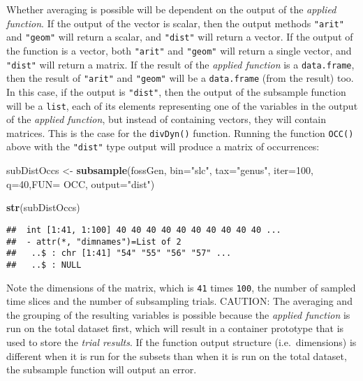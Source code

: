 \documentclass[]{article}
\newenvironment{Shaded}{\begin{snugshade}}{\end{snugshade}}
\newcommand{\DataTypeTok}[1]{\textcolor[rgb]{0.13,0.29,0.53}{#1}}
\newcommand{\DecValTok}[1]{\textcolor[rgb]{0.00,0.00,0.81}{#1}}
\newcommand{\KeywordTok}[1]{\textcolor[rgb]{0.13,0.29,0.53}{\textbf{#1}}}
\newcommand{\NormalTok}[1]{#1}
\newcommand{\StringTok}[1]{\textcolor[rgb]{0.31,0.60,0.02}{#1}}
\begin{document}
Whether averaging is possible will be dependent on the output of the
\emph{applied function}. If the output of the vector is scalar, then the
output methods \texttt{"arit"} and \texttt{"geom"} will return a scalar,
and \texttt{"dist"} will return a vector. If the output of the function
is a vector, both \texttt{"arit"} and \texttt{"geom"} will return a
single vector, and \texttt{"dist"} will return a matrix. If the result
of the \emph{applied function} is a \texttt{data.frame}, then the result
of \texttt{"arit"} and \texttt{"geom"} will be a \texttt{data.frame}
(from the result) too. In this case, if the output is \texttt{"dist"},
then the output of the subsample function will be a \texttt{list}, each
of its elements representing one of the variables in the output of the
\emph{applied function}, but instead of containing vectors, they will
contain matrices. This is the case for the \texttt{divDyn()} function.
Running the function \texttt{OCC()} above with the \texttt{"dist"} type
output will produce a matrix of occurrences:

\begin{Shaded}
\begin{Highlighting}[]
\NormalTok{subDistOccs <-}\StringTok{ }\KeywordTok{subsample}\NormalTok{(fossGen, }\DataTypeTok{bin=}\StringTok{"slc"}\NormalTok{, }\DataTypeTok{tax=}\StringTok{"genus"}\NormalTok{, }
  \DataTypeTok{iter=}\DecValTok{100}\NormalTok{, }\DataTypeTok{q=}\DecValTok{40}\NormalTok{,}\DataTypeTok{FUN=}\NormalTok{ OCC, }\DataTypeTok{output=}\StringTok{"dist"}\NormalTok{)}
\end{Highlighting}
\end{Shaded}

\begin{Shaded}
\begin{Highlighting}[]
\KeywordTok{str}\NormalTok{(subDistOccs)}
\end{Highlighting}
\end{Shaded}

\begin{verbatim}
##  int [1:41, 1:100] 40 40 40 40 40 40 40 40 40 40 ...
##  - attr(*, "dimnames")=List of 2
##   ..$ : chr [1:41] "54" "55" "56" "57" ...
##   ..$ : NULL
\end{verbatim}

Note the dimensions of the matrix, which is \texttt{41} times
\texttt{100}, the number of sampled time slices and the number of
subsampling trials. CAUTION: The averaging and the grouping of the
resulting variables is possible because the \emph{applied function} is
run on the total dataset first, which will result in a container
prototype that is used to store the \emph{trial results}. If the
function output structure (i.e.~dimensions) is different when it is run
for the subsets than when it is run on the total dataset, the subsample
function will output an error.
\end{document}
